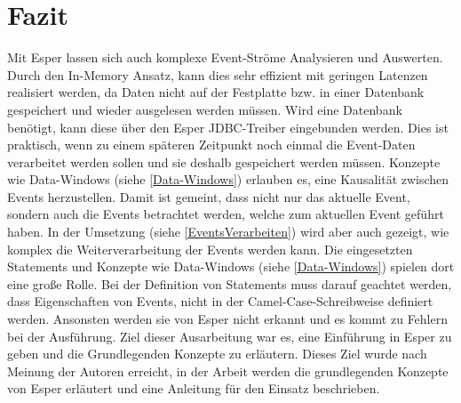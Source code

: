 \chapter{Fazit}
Mit Esper lassen sich auch komplexe Event-Ströme Analysieren und Auswerten. Durch den In-Memory Ansatz, kann dies sehr effizient mit geringen Latenzen realisiert werden,
da Daten nicht auf der Festplatte bzw. in einer Datenbank gespeichert und wieder ausgelesen werden müssen.
Wird eine Datenbank benötigt, kann diese über den Esper JDBC-Treiber eingebunden werden. Dies ist praktisch, wenn zu einem späteren Zeitpunkt noch einmal die Event-Daten verarbeitet werden sollen und sie deshalb gespeichert werden müssen.
\absatz
Konzepte wie Data-Windows (siehe \ref{Data-Windows}) erlauben es, eine Kausalität zwischen Events herzustellen.
Damit ist gemeint, dass nicht nur das aktuelle Event, sondern auch die Events betrachtet werden, welche zum aktuellen Event geführt haben.
\absatz
In der Umsetzung (siehe \ref{EventsVerarbeiten}) wird aber auch gezeigt, wie komplex die Weiterverarbeitung der Events werden kann. Die eingesetzten Statements und Konzepte wie Data-Windows (siehe \ref{Data-Windows}) spielen dort eine große Rolle.
Bei der Definition von Statements muss darauf geachtet werden, dass Eigenschaften von Events, nicht in der Camel-Case-Schreibweise definiert werden. Ansonsten werden sie von Esper nicht erkannt und es kommt zu Fehlern bei der Ausführung.
\absatz
Ziel dieser Ausarbeitung war es, eine Einführung in Esper zu geben und die Grundlegenden Konzepte zu erläutern. Dieses Ziel wurde nach Meinung der Autoren erreicht, in der Arbeit werden die grundlegenden Konzepte von Esper erläutert und eine Anleitung für den Einsatz beschrieben.